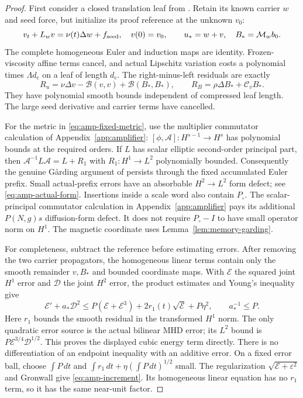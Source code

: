 \documentclass[11pt,a4paper]{amsart}
\theoremstyle{definition}
\theoremstyle{remark}
\numberwithin{equation}{section}
\newcommand{\Bcal}{\mathcal B}
\newcommand{\Ccal}{\mathcal C}
\newcommand{\Mcal}{\mathcal M}
\begin{document}
\begin{proof}
First consider a closed translation leaf from
\cite[Section~8.5]{Common}.  Retain its known carrier $w$ and seed force,
but initialize its proof reference at the unknown $v_0$:
\[
 v_t+L_wv=\nu(t)\Delta w+f_{\rm seed},\quad v(0)=v_0,
 \qquad u_*=w+v,\quad B_*=\Mcal_wb_0.
\]
The complete homogeneous Euler and induction maps are identity.
Frozen-viscosity affine terms cancel, and actual Lipschitz variation
costs a polynomial times $\Lambda d_{\mathrm c}$ on a leaf of length $d_{\mathrm c}$.
The right-minus-left residuals are exactly
\begin{equation}\label{eq:amp-increment-residual}
 R_u=\nu\Delta v-\Bcal(v,v)+\Bcal(B_*,B_*),\qquad
 R_B=\rho\Delta B_*+\Ccal_vB_*.
\end{equation}
They have polynomial smooth bounds independent of compressed leaf length.
The large seed derivative and carrier terms have cancelled.

For the metric in \eqref{eq:amp-fixed-metric}, use the multiplier
commutator calculation of Appendix~\ref{app:amplifier}:
$[\phi,\mathcal A]:H^{s-1}\to H^s$ has polynomial bounds at the
required orders.  If $L$ has scalar elliptic second-order principal
part, then $\mathcal A^{-1}L\mathcal A=L+R_1$ with
$R_1:H^1\to L^2$ polynomially bounded.
Consequently the genuine G\aa rding argument of
\cite[Lemmas~8.1--8.2]{Common} persists through the fixed accumulated
Euler prefix.  Small actual-prefix errors have an absorbable
$H^2\to L^2$ form defect; see \eqref{eq:amp-actual-form}.
Insertions inside a scale word also contain $P_\circ$.
The scalar-principal commutator calculation in
Appendix~\ref{app:amplifier} pays its additional $P(N,g)s$
diffusion-form defect. It does not require $P_\circ-I$ to have small
operator norm on $H^1$.
The magnetic coordinate uses Lemma~\ref{lem:memory-garding}.

For completeness, subtract the reference before estimating errors.
After removing the two carrier propagators, the homogeneous linear
terms contain only the smooth remainder $v,B_*$ and bounded coordinate
maps.  With $\mathcal E$ the squared joint $H^1$ error and $\mathcal D$
the joint $H^2$ error, the product estimates and Young's inequality give
\begin{equation}\label{eq:amp-direct-energy}
 \mathcal E'+a_* \mathcal D^2
 \le P(\mathcal E+\mathcal E^3)
       +2r_1(t)\sqrt{\mathcal E}+P\eta^2,
 \qquad a_*^{-1}\le P .
\end{equation}
Here $r_1$ bounds the smooth residual in the transformed $H^1$ norm.
The only quadratic error source is the actual bilinear MHD error;
its $L^2$ bound is $P\mathcal E^{3/4}\mathcal D^{1/2}$.
This proves the displayed cubic energy term directly.
There is no differentiation of an endpoint inequality with an additive
error.  On a fixed error ball, choose $\int P\,dt$ and
$\int r_1\,dt+\eta(\int P\,dt)^{1/2}$ small.
The regularization $\sqrt{\mathcal E+\varepsilon^2}$ and Gronwall
give \eqref{eq:amp-increment}.  Its homogeneous linear equation has
no $r_1$ term, so it has the same near-unit factor.


\end{proof}
\end{document}
